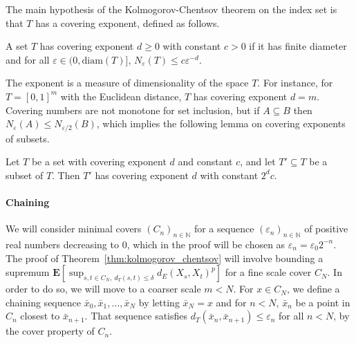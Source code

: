 \documentclass[lean]{Draft}
\makeatletter
\newcommand\leanlink{\begingroup\catcode`\#=12\relax\@leanlink}
\newcommand\@leanlink[2]{\endgroup
\href{#1}
{\texttt{\detokenize{#2}}}}
\newcommand{\mllink}[3]{%
\leanlink{https://github.com/leanprover-community/mathlib4/blob/6135ffb78e8bcd3fcc8ec02f3f82ea0b0737358b/Mathlib/#1.lean\##2}
{#3}}
\makeatother
\begin{document}
The main hypothesis of the Kolmogorov-Chentsov theorem on the index set is that $T$ has a covering exponent, defined as follows.

\begin{definition}[\mllink{Topology/MetricSpace/CoveringExponent}{L41-L46}{Metric.HasCoveringExponent}]\label{def:bounded_covering_number}
A set $T$ has covering exponent $d \ge 0$ with constant $c > 0$ if it has finite diameter and for all $\varepsilon \in (0, \mathrm{diam}(T)]$, $N_\varepsilon(T) \le c \varepsilon^{-d}$.
\end{definition}

The exponent is a measure of dimensionality of the space $T$.
For instance, for $T = [0,1]^m$ with the Euclidean distance, $T$ has covering exponent $d = m$.
Covering numbers are not monotone for set inclusion, but if $A \subseteq B$ then $N_\varepsilon(A) \le N_{\varepsilon/2}(B)$, which implies the following lemma on covering exponents of subsets.

\begin{lemma}[\mllink{Topology/MetricSpace/CoveringExponent}{L65-L66}{Metric.HasCoveringExponent.subset}]\label{lem:covering_number_subset}
Let $T$ be a set with covering exponent $d$ and constant $c$, and let $T' \subseteq T$ be a subset of $T$.
Then $T'$ has covering exponent $d$ with constant $2^d c$.
\end{lemma}


\paragraph{Chaining}

We will consider minimal covers $(C_n)_{n \in \mathbb{N}}$ for a sequence $(\varepsilon_n)_{n \in \mathbb{N}}$ of positive real numbers decreasing to $0$, which in the proof will be chosen as $\varepsilon_n = \varepsilon_0 2^{-n}$.
The proof of Theorem~\ref{thm:kolmogorov_chentsov} will involve bounding a supremum $\mathbf{E}\left[\sup_{s, t \in C_N, \: d_T(s, t) \le \delta}d_E(X_s, X_t)^p\right]$ for a fine scale cover $C_N$.
In order to do so, we will move to a coarser scale $m < N$.
For $x \in C_N$, we define a chaining sequence $\bar{x}_0, \bar{x}_1, \ldots, \bar{x}_N$ by letting $\bar{x}_N = x$ and for $n < N$, $\bar{x}_n$ be a point in $C_n$ closest to $\bar{x}_{n+1}$.
That sequence satisfies $d_T(\bar{x}_n, \bar{x}_{n+1}) \le \varepsilon_n$ for all $n < N$, by the cover property of $C_n$.
\end{document}
